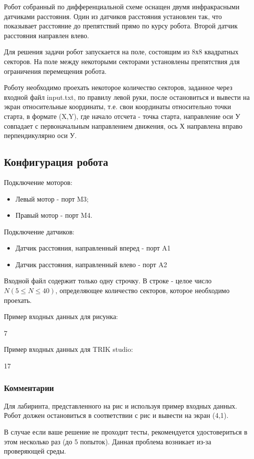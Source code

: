 
Робот собранный по дифференциальной схеме оснащен двумя инфракрасными датчиками расстояния. Один из датчиков расстояния установлен так, что показывает расстояние до препятствий прямо по курсу робота. Второй датчик расстояния направлен влево.


Для решения задачи робот запускается на поле, состоящим из 8х8 квадратных секторов. На поле между некоторыми секторами установлены препятствия для ограничения перемещения робота.

Роботу необходимо проехать некоторое количество секторов, заданное через входной файл input.txt, по правилу левой руки, после остановиться и вывести на экран относительные координаты, т.е. свои координаты относительно точки старта, в формате (X,Y), где начало отсчета - точка старта, направление оси У совпадает с первоначальным направлением движения, ось Х направлена вправо перпендикулярно оси У.

\subsection*{Конфигурация робота}

Подключение моторов:

\begin{itemize}
    \item Левый мотор - порт M3;
    \item Правый мотор - порт M4.
\end{itemize}

Подключение датчиков:

\begin{itemize}
    \item Датчик расстояния, направленный вперед - порт A1
    \item Датчик расстояния, направленный влево - порт A2
\end{itemize}


 
Входной файл содержит только одну строчку. В строке - целое число $N (5 \leq N \leq 40)$, определяющее количество секторов, которое необходимо проехать.

Пример входных данных для рисунка:

7

Пример входных данных для TRIK studio:

17

\subsubsection*{Комментарии}

Для лабиринта, представленного на рис и используя пример входных данных. Робот должен остановиться в соответствии с рис и вывести на экран (4,1).

В случае если ваше решение не проходит тесты, рекомендуется удостовериться в этом несколько раз (до 5 попыток).  Данная проблема возникает из-за проверяющей среды.

